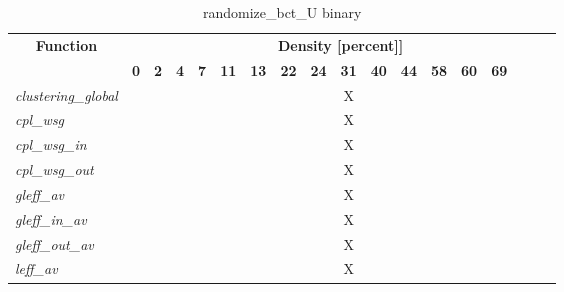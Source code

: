 \begin{table}[h] \centering \begin{tabular}{|l|c|c|c|c|c|c|c|c|c|c|c|c|c|c|} \hline\multicolumn{1}{|c|}{\textbf{\large{Function}}} & \multicolumn{17}{c|}{\large{\textbf{Density [percent]]}}}\\\cline{2-18}  & \textbf{0} &  \textbf{2} &  \textbf{4} &  \textbf{7} &  \textbf{11} &  \textbf{13} &  \textbf{22} &  \textbf{24} &  \textbf{31} &  \textbf{40} &  \textbf{44} &  \textbf{58} &  \textbf{60} &  \textbf{69} \\ \hline   \textit{clustering\_global} &   &   &   &   &   &   &   &   & X &   &   &   &   &   \\ \hline  \textit{cpl\_wsg} &   &   &   &   &   &   &   &   & X &   &   &   &   &   \\ \hline  \textit{cpl\_wsg\_in} &   &   &   &   &   &   &   &   & X &   &   &   &   &   \\ \hline  \textit{cpl\_wsg\_out} &   &   &   &   &   &   &   &   & X &   &   &   &   &   \\ \hline  \textit{gleff\_av} &   &   &   &   &   &   &   &   & X &   &   &   &   &   \\ \hline  \textit{gleff\_in\_av} &   &   &   &   &   &   &   &   & X &   &   &   &   &   \\ \hline  \textit{gleff\_out\_av} &   &   &   &   &   &   &   &   & X &   &   &   &   &   \\ \hline  \textit{leff\_av} &   &   &   &   &   &   &   &   & X &   &   &   &   &   \\ \hline \end{tabular}\caption{randomize\_bct\_U binary}\label{tab:my_label} \end{table}